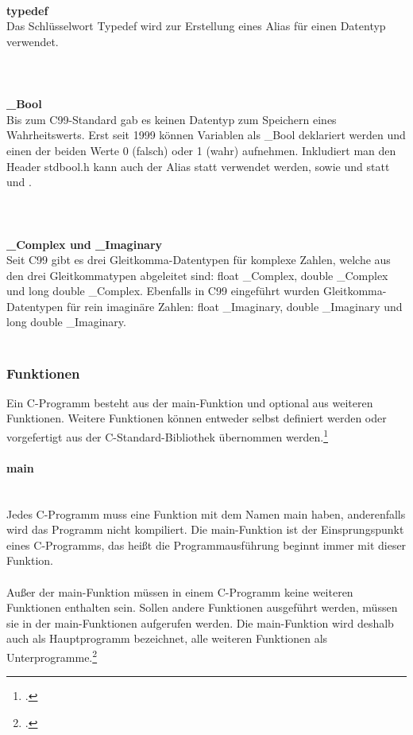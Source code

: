 \ \\
\textbf{typedef}\\
Das Schlüsselwort Typedef wird zur Erstellung eines Alias für einen Datentyp verwendet.\\
\ \\
\\
\ \\
\textbf{\_Bool}\\
Bis zum C99-Standard gab es keinen Datentyp zum Speichern eines Wahrheitswerts. Erst seit 1999 können Variablen als \_Bool deklariert werden und einen der beiden Werte 0 (falsch) oder 1 (wahr) aufnehmen. Inkludiert man den Header stdbool.h kann auch der Alias  statt  verwendet werden, sowie  und  statt  und .\\
\ \\
\\
\ \\
\textbf{\_Complex und \_Imaginary}\\
Seit C99 gibt es drei Gleitkomma-Datentypen für komplexe Zahlen, welche aus den drei Gleitkommatypen abgeleitet sind: float \_Complex, double \_Complex und long double \_Complex. Ebenfalls in C99 eingeführt wurden Gleitkomma-Datentypen für rein imaginäre Zahlen: float \_Imaginary, double \_Imaginary und long double \_Imaginary.\\
\ \\
\cite{c_wiki}
\subsubsection{Funktionen}

Ein C-Programm besteht aus der main-Funktion und optional aus weiteren Funktionen. Weitere Funktionen können entweder selbst definiert werden oder vorgefertigt aus der C-Standard-Bibliothek übernommen werden.\footcite{c_wiki}

\paragraph{main}
\ \\
Jedes C-Programm muss eine Funktion mit dem Namen main haben, anderenfalls wird das Programm nicht kompiliert. Die main-Funktion ist der Einsprungspunkt eines C-Programms, das heißt die Programmausführung beginnt immer mit dieser Funktion.\\
\\
Außer der main-Funktion müssen in einem C-Programm keine weiteren Funktionen enthalten sein. Sollen andere Funktionen ausgeführt werden, müssen sie in der main-Funktionen aufgerufen werden. Die main-Funktion wird deshalb auch als Hauptprogramm bezeichnet, alle weiteren Funktionen als Unterprogramme.\footcite{c_wiki}
